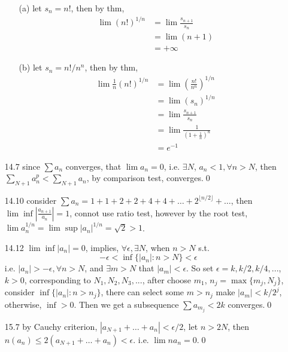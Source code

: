 \documentclass[paper=a4, fontsize=11pt]{scrartcl} %
\numberwithin{equation}{section} %
\numberwithin{figure}{section} %
\numberwithin{table}{section} %
\begin{document}
\begin{itemize}
\begin{itemize}
	\item[(a)] let $s_n = n!$, then by thm,
		\begin{equation}\begin{split}
			\lim (n!)^{1/n} &= \lim \frac{s_{n+1}}{s_n} \\
			&= \lim (n+1) \\ 
			&= +\infty
		\end{split}\end{equation}
	\item[(b)] let $s_n = n!/n^n$, then by thm,
		\begin{equation}\begin{split}
			\lim \frac{1}{n}(n!)^{1/n} &=  \lim (\frac{n!}{n^n})^{1/n}\\
			&= \lim (s_n)^{1/n}\\
			&= \lim \frac{s_{n+1}}{s_n} \\ 
			&= \lim \frac{1}{(1+\frac{1}{n})^n} \\
			&= e^{-1}
		\end{split}\end{equation}
	\end{itemize}
\item[14.7] since $\sum a_n$ converges, that $\lim a_n=0$, i.e. $\exists N$, $a_n<1, \forall n>N$, then $\sum_{N+1} a_n^p <\sum_{N+1} a_n$, by comparison test, converges.\qed
\item[14.10] consider $\sum a_n = 1 + 1 + 2 + 2+ 4+ 4+ \dots+ 2^{\lfloor n/2\rfloor}+\dots$, then $\lim\inf|\frac{a_{n+1}}{a_n}| = 1$, connot use ratio test, however by the root test, $\lim a_n^{1/n}=\lim\sup |a_n|^{1/n} = \sqrt{2}>1$.
\item[14.12] $\lim\inf|a_n| = 0$, implies, $\forall \epsilon, \exists N$, when $n>N$ s.t.
\begin{equation}
-\epsilon < \inf\{|a_n|: n>N\} <\epsilon
\end{equation}
i.e. $|a_n|>-\epsilon,\forall n>N$, and $\exists m>N$ that $|a_m|<\epsilon$. So set $\epsilon=k,k/2,k/4,...$, $k>0$, corresponding to $N_1,N_2,N_3,...$, after choose $m_1$, $n_{j} = \max\{m_j, N_j\}$, consider $\inf\{|a_n|: n>n_{j}\}$, there can select some $m>n_{j}$ make $|a_m|<k/2^{j}$, otherwise, $\inf>0$. Then we get a subsequence $\sum a_{m_j} < 2k$ converges.\qed
\item[15.7] by Cauchy criterion, $|a_{N+1}+\dots+ a_n| <\epsilon/2$, let $n>2N$, then $n(a_n)\leq 2 (a_{N+1}+\dots+ a_n) < \epsilon$. i.e. $\lim na_n = 0$.\qed
\end{itemize}
\end{document}
